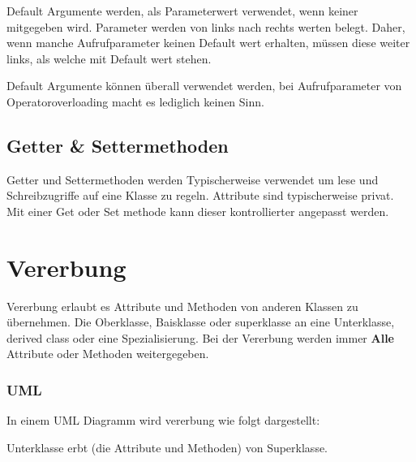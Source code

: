 Default Argumente werden, als Parameterwert verwendet, wenn keiner mitgegeben wird.
Parameter werden von links nach rechts werten belegt. 
Daher, wenn manche Aufrufparameter keinen Default wert erhalten, müssen diese weiter links, als welche mit Default wert stehen.  



Default Argumente können überall verwendet werden, bei Aufrufparameter von Operatoroverloading macht es lediglich keinen Sinn.

\subsection{Getter \& Settermethoden}

Getter und Settermethoden werden Typischerweise verwendet um lese und Schreibzugriffe auf eine Klasse zu regeln. 
Attribute sind typischerweise privat. 
Mit einer Get oder Set methode kann dieser kontrollierter angepasst  werden.\\



\section{Vererbung}

Vererbung erlaubt es Attribute und Methoden von anderen Klassen zu übernehmen. 
Die Oberklasse, Baisklasse oder superklasse  an eine Unterklasse, derived class oder eine Spezialisierung. 
Bei der Vererbung werden immer \textbf{Alle} Attribute oder Methoden weitergegeben.  


\subsubsection{UML}

In einem UML Diagramm wird vererbung wie folgt dargestellt:\\
\noindent
\begin{minipage}{0.6\columnwidth}
\begin{center}
\end{center}
\end{minipage}
\begin{minipage}{0.4\columnwidth}

Unterklasse erbt (die Attribute und Methoden) von Superklasse. 

\end{minipage}

